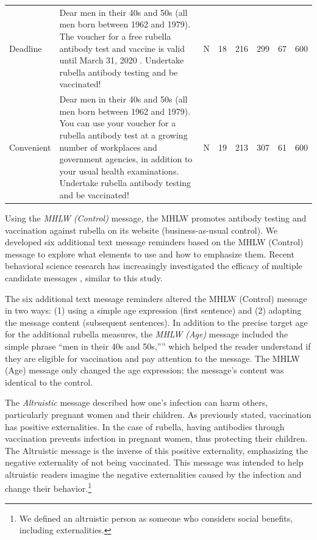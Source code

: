 \documentclass[
  11pt,
  a4paper
]{article}
\begin{document}
\begin{table}
\begin{tabular}[t]{l>{\raggedright\arraybackslash}p{20em}cccccc}
\addlinespace
Deadline & Dear men in their 40s and 50s (all men born between 1962 and 1979). The voucher for a free rubella antibody test and vaccine is valid until March 31, 2020 . Undertake rubella antibody testing and be vaccinated! & N & 18 & 216 & 299 & 67 & 600\\
\addlinespace
Convenient & Dear men in their 40s and 50s (all men born between 1962 and 1979). You can use your voucher for a rubella antibody test at a growing number of workplaces and government agencies, in addition to your usual health examinations. Undertake rubella antibody testing and be vaccinated! & N & 19 & 213 & 307 & 61 & 600\\
\bottomrule
\end{tabular}
\end{table}

Using the \emph{MHLW (Control)} message, the MHLW promotes antibody testing and vaccination against rubella on its website (business-as-usual control). We developed six additional text message reminders based on the MHLW (Control) message to explore what elements to use and how to emphasize them. Recent behavioral science research has increasingly investigated the efficacy of multiple candidate messages \citep[e.g.,][\citet{Milkman2021}]{Dai2021}, similar to this study.

The six additional text message reminders altered the MHLW (Control) message in two ways: (1) using a simple age expression (first sentence) and (2) adapting the message content (subsequent sentences). In addition to the precise target age for the additional rubella measures, the \emph{MHLW (Age)} message included the simple phrase ``men in their 40s and 50s,'''' which helped the reader understand if they are eligible for vaccination and pay attention to the message. The MHLW (Age) message only changed the age expression; the message's content was identical to the control.

The \emph{Altruistic} message described how one's infection can harm others, particularly pregnant women and their children. As previously stated, vaccination has positive externalities. In the case of rubella, having antibodies through vaccination prevents infection in pregnant women, thus protecting their children. The Altruistic message is the inverse of this positive externality, emphasizing the negative externality of not being vaccinated. This message was intended to help altruistic readers imagine the negative externalities caused by the infection and change their behavior.\footnote{We defined an altruistic person as someone who considers social benefits, including externalities.}
\end{document}
